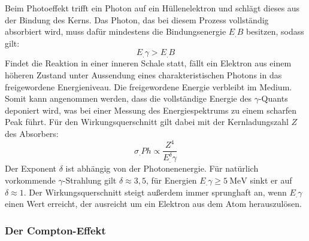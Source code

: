 Beim Photoeffekt trifft ein Photon auf ein Hüllenelektron und schlägt dieses aus der Bindung des Kerns. Das Photon, das bei diesem Prozess vollständig absorbiert wird, muss dafür mindestens die Bindungsenergie $E_.B$ besitzen, sodass gilt:
\[
E_.{\gamma}>E_.B
\]
Findet die Reaktion in einer inneren Schale statt, fällt ein Elektron aus einem höheren Zustand unter Aussendung eines charakteristischen Photons in das freigewordene Energieniveau. Die freigewordene Energie verbleibt im Medium. Somit kann angenommen werden, dass die vollständige Energie des $\gamma$-Quants deponiert wird, was bei einer Messung des Energiespektrums zu einem scharfen Peak führt.
Für den Wirkungsquerschnitt gilt dabei mit der Kernladungszahl $Z$ des Absorbers:
\[
\sigma_.{Ph}\propto\frac{Z^4}{E^{\delta}_.{\gamma}}
\]
Der Exponent $\delta$ ist abhängig von der Photonenenergie. Für natürlich vorkommende $\gamma$-Strahlung gilt $\delta\approx 3,5$, für Energien $E_.{\gamma}\geq \SI{5}{\mega\electronvolt}$ sinkt er auf $\delta\approx 1$.
Der Wirkungsquerschnitt steigt außerdem immer sprunghaft an, wenn $E_.{\gamma}$ einen Wert erreicht, der ausreicht um ein Elektron aus dem Atom herauszulösen.

\subsubsection{Der Compton-Effekt}

